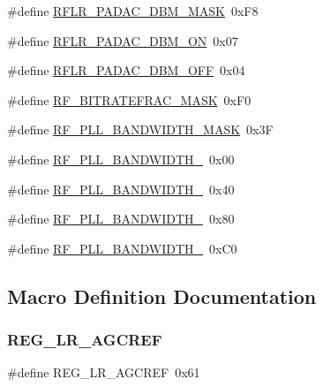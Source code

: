 \begin{DoxyCompactItemize}
\item 
\#define \hyperlink{sx1276Regs-LoRa_8h_a56956e6af4645664d25bd3cc40a3a477}{R\+F\+L\+R\+\_\+\+P\+A\+D\+A\+C\+\_\+D\+B\+M\+\_\+\+M\+A\+SK}~0x\+F8
\item 
\#define \hyperlink{sx1276Regs-LoRa_8h_a9e1e9d92a5d04b4c5ffcca9dde04cc7e}{R\+F\+L\+R\+\_\+\+P\+A\+D\+A\+C\+\_\+D\+B\+M\+\_\+\+ON}~0x07
\item 
\#define \hyperlink{sx1276Regs-LoRa_8h_a16791519b3052ba77fcc3bd3b1112fa2}{R\+F\+L\+R\+\_\+\+P\+A\+D\+A\+C\+\_\+D\+B\+M\+\_\+\+O\+FF}~0x04
\item 
\#define \hyperlink{sx1276Regs-LoRa_8h_a15a3a7765ab924197cdf57cbe3fc1160}{R\+F\+\_\+\+B\+I\+T\+R\+A\+T\+E\+F\+R\+A\+C\+\_\+\+M\+A\+SK}~0x\+F0
\item 
\#define \hyperlink{sx1276Regs-LoRa_8h_aac01efdf312f6264cbd8b48d6c94e0ea}{R\+F\+\_\+\+P\+L\+L\+\_\+\+B\+A\+N\+D\+W\+I\+D\+T\+H\+\_\+\+M\+A\+SK}~0x3F
\item 
\#define \hyperlink{sx1276Regs-LoRa_8h_afdfab4acc3525e87ce252cbf593c3255}{R\+F\+\_\+\+P\+L\+L\+\_\+\+B\+A\+N\+D\+W\+I\+D\+T\+H\+\_}~0x00
\item 
\#define \hyperlink{sx1276Regs-LoRa_8h_acb5d72344cac01094235aaf62ac05399}{R\+F\+\_\+\+P\+L\+L\+\_\+\+B\+A\+N\+D\+W\+I\+D\+T\+H\+\_}~0x40
\item 
\#define \hyperlink{sx1276Regs-LoRa_8h_aa5f41821cba4e1c23b0cf8b6eb05d021}{R\+F\+\_\+\+P\+L\+L\+\_\+\+B\+A\+N\+D\+W\+I\+D\+T\+H\+\_}~0x80
\item 
\#define \hyperlink{sx1276Regs-LoRa_8h_ae1e12342489e52885c9de6812079d6e8}{R\+F\+\_\+\+P\+L\+L\+\_\+\+B\+A\+N\+D\+W\+I\+D\+T\+H\+\_}~0x\+C0
\end{DoxyCompactItemize}


\subsection{Macro Definition Documentation}
\mbox{\label{sx1276Regs-LoRa_8h_a3ad00cd303907ff68744172e6bf219c8}} 
\subsubsection{\texorpdfstring{R\+E\+G\+\_\+\+L\+R\+\_\+\+A\+G\+C\+R\+EF}{REG\_LR\_AGCREF}}
{\footnotesize\ttfamily \#define R\+E\+G\+\_\+\+L\+R\+\_\+\+A\+G\+C\+R\+EF~0x61}

